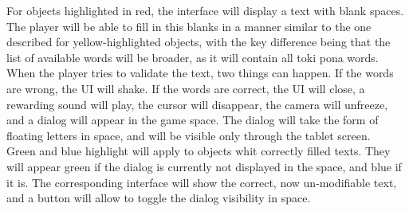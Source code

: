 \documentclass{scrartcl}
\begin{document}
			For objects highlighted in red, the interface will display a text with blank spaces. The player will be able to fill in this blanks in a manner similar to the one described for yellow-highlighted objects, with the key difference being that the list of available words will be broader, as it will contain all toki pona words. When the player tries to validate the text, two things can happen. If the words are wrong, the UI will shake. If the words are correct, the UI will close, a rewarding sound will play, the cursor will disappear, the camera will unfreeze, and a dialog will appear in the game space. The dialog will take the form of floating letters in space, and will be visible only through the tablet screen.\\
			Green and blue highlight will apply to objects whit correctly filled texts. They will appear green if the dialog is currently not displayed in the space, and blue if it is. The corresponding interface will show the correct, now un-modifiable text, and a button will allow to toggle the dialog visibility in space.
\end{document}
